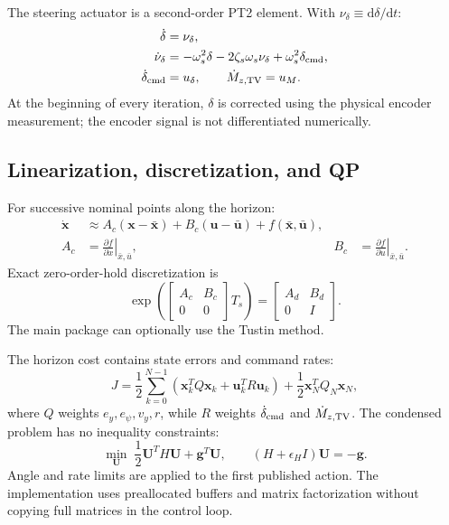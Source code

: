 \documentclass[11pt,a4paper]{article}
\newcommand{\vect}[1]{\bm{#1}}
\newcommand{\dd}{\mathrm{d}}
\begin{document}
The steering actuator is a second-order PT2 element. With
$\nu_\delta\equiv \dd\delta/\dd t$:
\begin{align}
\dot\delta&=\nu_\delta,\\
\dot\nu_\delta&=-\omega_s^2\delta
-2\zeta_s\omega_s\nu_\delta+\omega_s^2\delta_{\rm cmd},\\
\dot\delta_{\rm cmd}&=u_\delta,\qquad
\dot M_{z,\rm TV}=u_M.
\end{align}
At the beginning of every iteration, $\delta$ is corrected using the physical
encoder measurement; the encoder signal is not differentiated numerically.

\subsection{Linearization, discretization, and QP}

For successive nominal points along the horizon:
\begin{equation}
\begin{aligned}
\dot{\vect{x}} &\approx
A_c(\vect{x}-\bar{\vect{x}})
+B_c(\vect{u}-\bar{\vect{u}})
+f(\bar{\vect{x}},\bar{\vect{u}}),\\
A_c&=\left.\frac{\partial f}{\partial x}\right|_{\bar x,\bar u},
&
B_c&=\left.\frac{\partial f}{\partial u}\right|_{\bar x,\bar u}.
\end{aligned}
\end{equation}
Exact zero-order-hold discretization is
\begin{equation}
\exp\!\left(
\begin{bmatrix}A_c&B_c\\0&0\end{bmatrix}T_s
\right)
=
\begin{bmatrix}A_d&B_d\\0&I\end{bmatrix}.
\end{equation}
The main package can optionally use the Tustin method.

The horizon cost contains state errors and command rates:
\begin{equation}
J=\frac12\sum_{k=0}^{N-1}
\left(\vect{x}_k^TQ\vect{x}_k+\vect{u}_k^TR\vect{u}_k\right)
+\frac12\vect{x}_N^TQ_N\vect{x}_N,
\end{equation}
where $Q$ weights $e_y,e_\psi,v_y,r$, while $R$ weights
$\dot\delta_{\rm cmd}$ and $\dot M_{z,\rm TV}$. The condensed problem has no
inequality constraints:
\begin{equation}
\min_{\vect{U}}\;\frac12\vect{U}^TH\vect{U}+\vect{g}^T\vect{U},
\qquad
(H+\epsilon_HI)\vect{U}=-\vect{g}.
\end{equation}
Angle and rate limits are applied to the first published action. The
implementation uses preallocated buffers and matrix factorization without
copying full matrices in the control loop.
\end{document}

